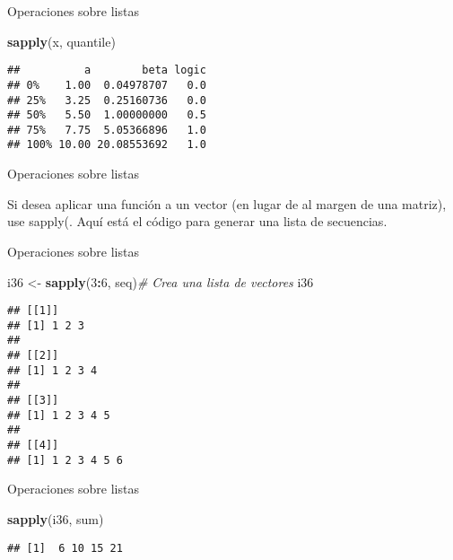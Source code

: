 \documentclass[ignorenonframetext,]{beamer}
\newenvironment{Shaded}{\begin{snugshade}}{\end{snugshade}}
\newcommand{\KeywordTok}[1]{\textcolor[rgb]{0.13,0.29,0.53}{\textbf{#1}}}
\newcommand{\DecValTok}[1]{\textcolor[rgb]{0.00,0.00,0.81}{#1}}
\newcommand{\StringTok}[1]{\textcolor[rgb]{0.31,0.60,0.02}{#1}}
\newcommand{\CommentTok}[1]{\textcolor[rgb]{0.56,0.35,0.01}{\textit{#1}}}
\newcommand{\OperatorTok}[1]{\textcolor[rgb]{0.81,0.36,0.00}{\textbf{#1}}}
\newcommand{\NormalTok}[1]{#1}
\begin{document}
\begin{frame}[fragile]{Operaciones sobre listas}

\begin{Shaded}
\begin{Highlighting}[]
\KeywordTok{sapply}\NormalTok{(x, quantile)}
\end{Highlighting}
\end{Shaded}

\begin{verbatim}
##          a        beta logic
## 0%    1.00  0.04978707   0.0
## 25%   3.25  0.25160736   0.0
## 50%   5.50  1.00000000   0.5
## 75%   7.75  5.05366896   1.0
## 100% 10.00 20.08553692   1.0
\end{verbatim}

\end{frame}

\begin{frame}{Operaciones sobre listas}

Si desea aplicar una función a un vector (en lugar de al margen de una
matriz), use sapply(. Aquí está el código para generar una lista de
secuencias.

\end{frame}

\begin{frame}[fragile]{Operaciones sobre listas}

\begin{Shaded}
\begin{Highlighting}[]
\NormalTok{i36 <-}\StringTok{ }\KeywordTok{sapply}\NormalTok{(}\DecValTok{3}\OperatorTok{:}\DecValTok{6}\NormalTok{, seq)}\CommentTok{# Crea una lista de vectores}
\NormalTok{i36}
\end{Highlighting}
\end{Shaded}

\begin{verbatim}
## [[1]]
## [1] 1 2 3
## 
## [[2]]
## [1] 1 2 3 4
## 
## [[3]]
## [1] 1 2 3 4 5
## 
## [[4]]
## [1] 1 2 3 4 5 6
\end{verbatim}

\end{frame}

\begin{frame}[fragile]{Operaciones sobre listas}

\begin{Shaded}
\begin{Highlighting}[]
\KeywordTok{sapply}\NormalTok{(i36, sum) }
\end{Highlighting}
\end{Shaded}

\begin{verbatim}
## [1]  6 10 15 21
\end{verbatim}

\end{frame}
\end{document}
